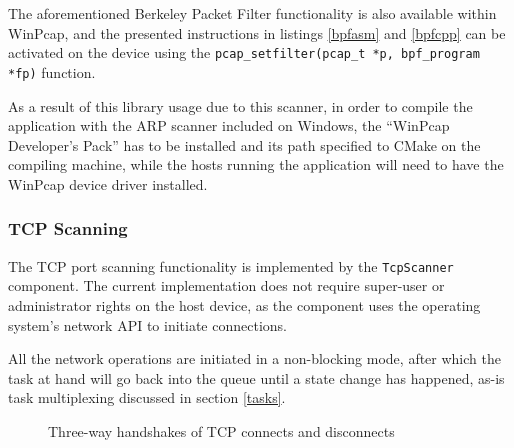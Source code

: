 \documentclass[a4paper,12pt]{article}
\begin{document}
	The aforementioned Berkeley Packet Filter functionality is also available within WinPcap, and the presented instructions in listings \ref{bpfasm} and \ref{bpfcpp} can be activated on the device using the \texttt{pcap_setfilter(pcap_t *p, bpf_program *fp)} function.
	
	As a result of this library usage due to this scanner, in order to compile the application with the ARP scanner included on Windows, the ``WinPcap Developer's Pack'' has to be installed and its path specified to CMake on the compiling machine, while the hosts running the application will need to have the WinPcap device driver installed.

\subsubsection{TCP Scanning} \label{tcpscan}
 

	The TCP port scanning functionality is implemented by the \texttt{TcpScanner} component. The current implementation does not require super-user or administrator rights on the host device, as the component uses the operating system's network API to initiate connections.
	
	All the network operations are initiated in a non-blocking mode, after which the task at hand will go back into the queue until a state change has happened, as-is task multiplexing discussed in section \ref{tasks}.

	\begin{figure}[!htbp]
		\centering
		\caption{Three-way handshakes of TCP connects and disconnects}
		\label{tcp3way}
	\end{figure}
	
\end{document}
